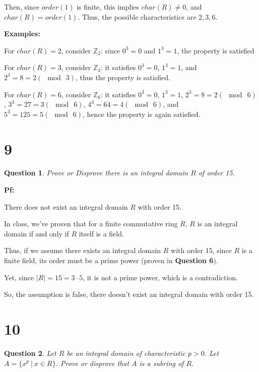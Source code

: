 \documentclass{article}
\newtheorem{question}{Question}
\begin{document}
\hfill

Then, since $order(1)$ is finite, this implies $char(R)\neq 0$, and $char(R)=order(1)$. Thus, the possible characteristics are $2,3,6$.

\hfill

\textbf{Examples:}

For $char(R)=2$, consider $\mathbb{Z}_2$: since $0^3 = 0$ and $1^3=1$, the property is satisfied

For $char(R)=3$, consider $\mathbb{Z}_3$: it satisfies $0^3=0$, $1^3=1$, and $2^3 = 8 = 2 (\mod\ 3)$, thus the property is satisfied.

For $char(R)=6$, consider $\mathbb{Z}_6$: it satisfies $0^3=0$, $1^3=1$, $2^3=8=2(\mod\ 6)$, $3^3=27=3 (\mod\ 6)$, $4^3=64=4(\mod\ 6)$, and $5^3=125=5(\mod\ 6)$, hence the property is again satisfied.

\hfill

\hfill


\section*{9}
\begin{myBox}[]{}
    \begin{question}
        Prove or Disprove there is an integral domain $R$ of order 15.
    \end{question}
\end{myBox}

\textbf{Pf:}

There does not exist an integral domain $R$ with order 15.

In class, we've proven that for a finite commutative ring $R$, $R$ is an integral domain if and only if $R$ itself is a field.

Thus, if we assume there exists an integral domain $R$ with order 15, since $R$ is a finite field, its order must be a prime power (proven in \textbf{Question 6}).

Yet, since $|R|=15=3\cdot 5$, it is not a prime power, which is a contradiction.

So, the assumption is false, there doesn't exist an integral domain with order 15.

\hfill

\hfill


\section*{10}
\begin{myBox}[]{}
    \begin{question}
        Let $R$ be an integral domain of characteristic $p > 0$. Let $A = \{x^p\ |\ x\in R\}$. Prove or
        disprove that $A$ is a subring of $R$.
    \end{question}
\end{myBox}
\end{document}
